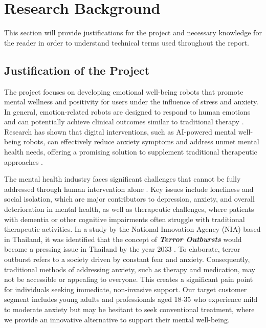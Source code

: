 \section{Research Background}
This section will provide justifications for the project and necessary knowledge for the reader in order to
understand technical terms used throughout the report.

\subsection{Justification of the Project}

The project focuses on developing emotional well-being robots that promote mental wellness and positivity for users under the influence of stress and anxiety. In general, emotion-related robots are designed to respond to human emotions and can potentially achieve clinical outcomes similar to traditional therapy \cite{Palmer2024.07.17.24310551}. Research has shown that digital interventions, such as AI-powered mental well-being robots, can effectively reduce anxiety symptoms and address unmet mental health needs, offering a promising solution to supplement traditional therapeutic approaches \cite{jarvis2024companion}.

The mental health industry faces significant challenges that cannot be fully addressed through human intervention alone \cite{charles-2024}. Key issues include loneliness and social isolation, which are major contributors to depression, anxiety, and overall deterioration in mental health, as well as therapeutic challenges, where patients with dementia or other cognitive impairments often struggle with traditional therapeutic activities. In a study by the National Innovation Agency (NIA) based in Thailand, it was identified that the concept of \textbf{\textit{Terror Outbursts}} would become a pressing issue in Thailand by the year 2033 \cite{nia2023}. To elaborate, terror outburst refers to a society driven by constant fear and anxiety. Consequently, traditional methods of addressing anxiety, such as therapy and medication, may not be accessible or appealing to everyone. This creates a significant pain point for individuals seeking immediate, non-invasive support. Our target customer segment includes young adults and professionals aged 18-35 who experience mild to moderate anxiety but may be hesitant to seek conventional treatment, where we provide an innovative alternative to support their mental well-being.

